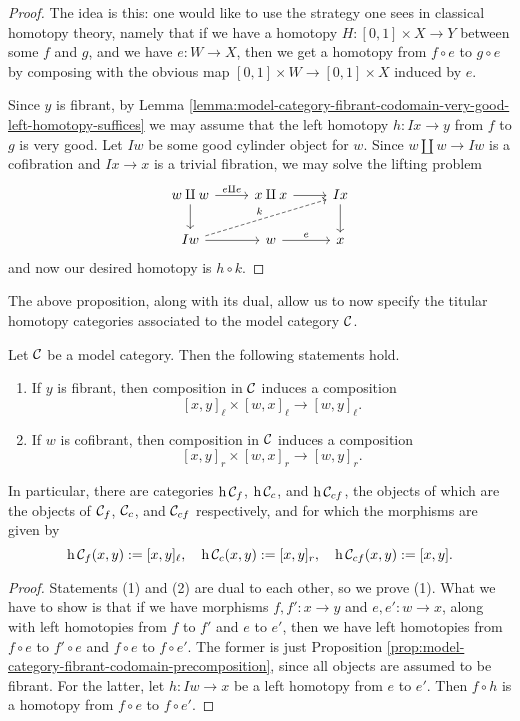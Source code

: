 \begin{proof}
The idea is this: one would like to use the strategy one sees in classical homotopy theory, namely that if we have a homotopy \(H\!:[0,1]\times X\to Y\) between some \(f\) and \(g\),
and we have \(e\!:W\to X\), then we get a homotopy from \(f\circ e\) to \(g\circ e\) by composing with the obvious map \([0,1]\times W\to [0,1]\times X\) induced by \(e\).

Since \(y\) is fibrant, by Lemma \ref{lemma:model-category-fibrant-codomain-very-good-left-homotopy-suffices} we may assume that the left homotopy \(h\!:Ix\to y\) from \(f\) to \(g\) is very good.
Let \(Iw\) be some good cylinder object for \(w\). Since \(w\amalg w \to Iw\) is a cofibration and \(Ix\to x\) is a trivial fibration, we may solve the lifting problem
\[
	\begin{tikzcd}
		w\amalg w\ar[d] \ar[r,"e\amalg e"] & x \amalg x \ar[r] & Ix \ar[d] \\
		Iw\ar[r]\ar[urr,dashed,"k"] & w\ar[r,"e"] & x
	\end{tikzcd}
\]
and now our desired homotopy is \(h\circ k\).
\end{proof}

The above proposition, along with its dual, allow us to now specify the titular homotopy categories associated to the model category \(\mathcal{C}\).

\begin{propositiondef}\label{prop:propdef-model-category-homotopy-composition}
	Let \(\mathcal{C}\) be a model category. Then the following statements hold.
	\begin{enumerate}[label=(\arabic*)]
		\item If \(y\) is fibrant, then composition in \(\mathcal{C}\) induces a composition
			\[ [x,y]_\ell \times [w,x]_\ell \to [w,y]_\ell. \]
		\item If \(w\) is cofibrant, then composition in \(\mathcal{C}\) induces a composition
			\[ [x,y]_r \times [w,x]_r \to [w,y]_r. \]
	\end{enumerate}
	In particular, there are categories \(\operatorname{h}{\mathcal{C}_f}\), \(\operatorname{h}{\mathcal{C}_c}\), and \(\operatorname{h}{\mathcal{C}_{cf}}\), the objects of which are the objects of \(\mathcal{C}_f\), \(\mathcal{C}_c\), and \(\mathcal{C}_{cf}\) respectively,
	and for which the morphisms are given by
	\[ \operatorname{h}{\mathcal{C}_f}(x,y) := [x,y]_\ell,\quad \operatorname{h}{\mathcal{C}_c}(x,y) := [x,y]_r,\quad \operatorname{h}{\mathcal{C}_{cf}}(x,y) := [x,y]. \]
\end{propositiondef}
\begin{proof}
Statements (1) and (2) are dual to each other, so we prove (1). What we have to show is that if we have morphisms \(f,f'\!:x\to y\) and \(e,e'\!:w\to x\), along
with left homotopies from \(f\) to \(f'\) and \(e\) to \(e'\), then we have left homotopies from \(f\circ e\) to \(f'\circ e\) and \(f\circ e\) to \(f\circ e'\).
The former is just Proposition \ref{prop:model-category-fibrant-codomain-precomposition}, since all objects are assumed to be fibrant. For the latter,
let \(h\!:Iw\to x\) be a left homotopy from \(e\) to \(e'\). Then \(f\circ h\) is a homotopy from \(f\circ e\) to \(f\circ e'\).
\end{proof}

